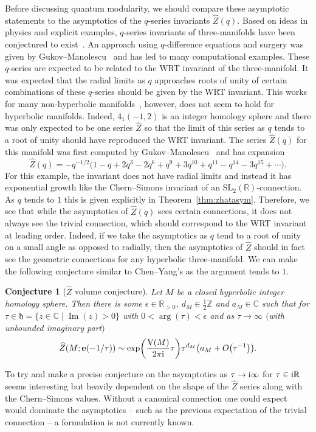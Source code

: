 \documentclass[pdftex]{sigma}
\numberwithin{equation}{section}
\newtheorem{Conjecture}[Theorem]{Conjecture}
\def\BZ{\mathbb{Z}}
\def\BR{\mathbb{R}}
\def\BC{\mathbb{C}}
\def\SL{\mathrm{SL}}
\def\e{\mathbf e}
\def\VC{\mathrm{VC}}
\def\SL{\mathrm{SL}}
\def\UHP{\mathfrak{h}}
\def\BZ{\mathbb Z}
\def\BR{\mathbb R}
\def\BC{\mathbb C}
\def\SL{\mathrm{SL}}
\def\Im{\operatorname{Im}}
\def\VC{\mathrm{V}}
\begin{document}
Before discussing quantum modularity, we should compare these asymptotic statements to the asymptotics of the $q$-series invariants $\widehat{Z}(q)$. Based on ideas in physics and explicit examples, $q$-series invariants of three-manifolds have been conjectured to exist~\cite{BeemDimPas,Cheng:3dmod,GZ:qser,GukovMan,GPPV,GPV,Hikami,LawrenceZag}. An approach using $q$-difference equations and surgery was given by Gukov--Manolescu~\cite{GukovMan} and has led to many computational examples. These $q$-series are expected to be related to the WRT invariant of the three-manifold. It was expected that the radial limits as $q$ approaches roots of unity of certain combinations of these $q$-series should be given by the WRT invariant. This works for many non-hyperbolic manifolds~\cite{AM:res,Cheng:3dmod}, however, does not seem to hold for hyperbolic manifolds. Indeed, $4_1(-1,2)$ is an integer homology sphere and there was only expected to be one series $\widehat{Z}$ so that the limit of this series as $q$ tends to a root of unity should have reproduced the WRT invariant. The series $\widehat{Z}(q)$ for this manifold was first computed by Gukov--Manolescu~\cite{GukovMan} and has expansion
\[
 \widehat{Z}(q)
  =
 -q^{-1/2}\bigl(1 - q + 2q^3 - 2q^6 + q^9 + 3q^{10} + q^{11} - q^{14} - 3q^{15}+\cdots\bigr) .
\]
For this example, the invariant does not have radial limits and instead it has exponential growth like the Chern--Simons invariant of an $\SL_{2}(\BR)$-connection. As $q$ tends to $1$ this is given explicitly in Theorem~\ref{thm:zhatasym}. Therefore, we see that while the asymptotics of $\widehat{Z}(q)$ sees certain connections, it does not always see the trivial connection, which should correspond to the WRT invariant at leading order. Indeed, if we take the asymptotics as $q$ tend to a root of unity on a small angle as opposed to radially, then the asymptotics of $\widehat{Z}$ should in fact see the geometric connections for any hyperbolic three-manifold. We can make the following conjecture similar to Chen--Yang's as the argument tends to $1$.
\begin{Conjecture}[$\widehat{Z}$ volume conjecture]%
Let $M$ be a closed hyperbolic integer homology sphere. Then there is some $\epsilon\in\BR_{>0}$, $d_M\in\frac{1}{2}\BZ$ and $a_M\in\BC$ such that for $\tau\in\UHP=\{z\in\BC\mid \Im(z)>0\}$ with $0<\arg(\tau)<\epsilon$ and as $\tau\rightarrow \infty$ $($with unbounded imaginary part$)$
\[
 \widehat{Z}(M;\e(-1/\tau))
 \sim
 \exp\biggl(\frac{\VC(M)}{2\pi {\rm i}}\tau\biggr)\tau^{d_M}\bigl(a_M+O\bigl(\tau^{-1}\bigr)\bigr) .
\]
\end{Conjecture}
To try and make a precise conjecture on the asymptotics as $\tau\rightarrow {\rm i}\infty$ for $\tau\in {\rm i}\BR$ seems interesting but heavily dependent on the shape of the $\widehat{Z}$ series along with the Chern--Simons values. Without a canonical connection one could expect would dominate the asymptotics -- such as the previous expectation of the trivial connection -- a formulation is not currently known.
\end{document}
